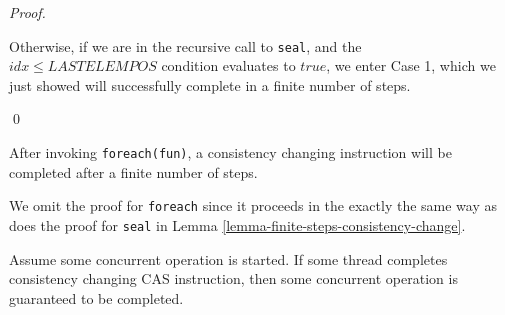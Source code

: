 \documentclass[runningheads,a4paper]{llncs}
\begin{document}
\begin{proof}
\begin{itemize}



Otherwise, if we are in the recursive call to \verb=seal=, and the $idx \leq LASTELEMPOS$ 
condition evaluates to $true$, we enter Case 1, which we just
showed will successfully complete in a finite number of steps.

\end{itemize}
\qed
\end{proof}


\begin{lemma}[Foreach]\label{lemma-foreach}
After invoking \verb=foreach(fun)=, a consistency changing instruction will
be completed after a finite number of steps.
\end{lemma}

We omit the proof for \verb=foreach= since it proceeds in the exactly the same way
as does the proof for \verb=seal= in Lemma 
\ref{lemma-finite-steps-consistency-change}.


\begin{lemma}\label{lemma-operation-completes}
Assume some concurrent operation is started. If some thread completes
consistency changing CAS instruction, then some concurrent operation is
guaranteed to be completed.
\end{lemma}
\end{document}

